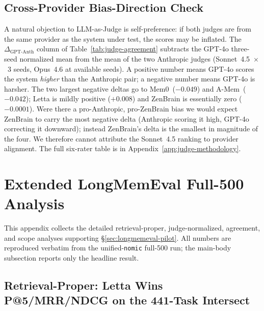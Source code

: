 \documentclass{article}
\begin{document}
\subsection{Cross-Provider Bias-Direction Check}
\label{sec:bias-check}

A natural objection to LLM-as-Judge is self-preference: if both
judges are from the same provider as the system under test, the
scores may be inflated.
The $\Delta_{\text{GPT-Anth}}$ column of
Table~\ref{tab:judge-agreement} subtracts the GPT-4o three-seed
normalized mean from the mean of the two Anthropic judges
(Sonnet~4.5~$\times$~3 seeds, Opus~4.6 at available seeds).
A positive number means GPT-4o scores the system \emph{higher} than
the Anthropic pair; a negative number means GPT-4o is harsher.
The two largest negative deltas go to Mem0~($-0.049$) and
A-Mem~($-0.042$); Letta is mildly positive
($+0.008$) and ZenBrain is essentially zero ($-0.0001$).
Were there a pro-Anthropic, pro-ZenBrain bias we would expect
ZenBrain to carry the most negative delta (Anthropic scoring it
high, GPT-4o correcting it downward); instead ZenBrain's delta
is the smallest in magnitude of the four.
We therefore cannot attribute the Sonnet~4.5 ranking to provider
alignment.
The full six-rater table is in Appendix~\ref{app:judge-methodology}.

\section{Extended LongMemEval Full-500 Analysis}
\label{app:extended-longmemeval}

This appendix collects the detailed retrieval-proper, judge-normalized,
agreement, and scope analyses supporting
\S\ref{sec:longmemeval-pilot}. All numbers are reproduced verbatim from
the unified-\texttt{nomic} full-500 run; the main-body subsection
reports only the headline result.

\subsection{Retrieval-Proper: Letta Wins P@5/MRR/NDCG on the 441-Task Intersect}
\label{app:longmemeval-retrieval}
\end{document}
